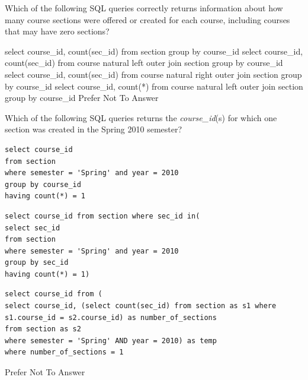 \documentclass[12pt, addpoints, answers]{exam}
\begin{document}
\begin{questions}
\begin{minipage}{\linewidth}
\question[4]
Which of the following SQL queries correctly returns information about how many course sections were offered or created for each course, 
including courses that may have zero sections?\par\vspace{0.5em}
\begin{checkboxes} 
    \choice select course\_id, count(sec\_id) from section group by course\_id
    \CorrectChoice select course\_id, count(sec\_id) from course natural left outer join section group by course\_id
    \choice select course\_id, count(sec\_id) from course natural right outer join section group by course\_id
    \choice select course\_id, count(*) from course natural left outer join section group by course\_id
    \CorrectChoice Prefer Not To Answer
\end{checkboxes}
\end{minipage}\vspace{1em}

\begin{minipage}{\linewidth}
\question[6]
Which of the following SQL queries returns the \textit{course\_id}(s) for which one section was created in the Spring 2010 semester?\par\vspace{0.5em}
\begin{checkboxes} 
    \CorrectChoice \begin{verbatim}
select course_id 
from section
where semester = 'Spring' and year = 2010
group by course_id
having count(*) = 1
    \end{verbatim}
    \choice \begin{verbatim}
select course_id from section where sec_id in(
select sec_id
from section
where semester = 'Spring' and year = 2010
group by sec_id
having count(*) = 1)
    \end{verbatim}
    \choice \begin{verbatim}
select course_id from (
select course_id, (select count(sec_id) from section as s1 where 
s1.course_id = s2.course_id) as number_of_sections
from section as s2
where semester = 'Spring' AND year = 2010) as temp
where number_of_sections = 1
    \end{verbatim}
    \CorrectChoice Prefer Not To Answer
\end{checkboxes}
\end{minipage}\vspace{1em}

\end{questions}
\end{document}
